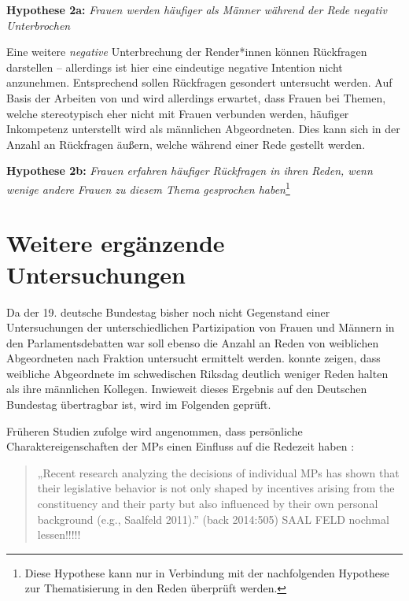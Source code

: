 \documentclass[12pt, 
    twoside=false, 
    bibliography=totoc, 
    numbers=endperiod, 
    headings=normal, 
    toc=chapterentrydotfill
    ]{scrbook}
\begin{document}
\textbf{Hypothese 2a:} \emph{Frauen werden häufiger als Männer während der Rede negativ Unterbrochen}

Eine weitere \emph{negative} Unterbrechung der Render*innen können Rückfragen darstellen -- allerdings ist hier eine eindeutige negative Intention nicht anzunehmen. Entsprechend sollen Rückfragen gesondert untersucht werden. Auf Basis der Arbeiten von \textcite{brescoll_2011} und \textcite{eagly_2002}  wird allerdings erwartet, dass Frauen bei Themen, welche stereotypisch eher nicht mit Frauen verbunden werden, häufiger Inkompetenz unterstellt wird als männlichen Abgeordneten. Dies kann sich in der Anzahl an Rückfragen äußern, welche während einer Rede gestellt werden. 

\textbf{Hypothese 2b:} \emph{Frauen erfahren häufiger Rückfragen in ihren Reden, wenn wenige andere Frauen zu diesem Thema gesprochen haben}\footnote{Diese Hypothese kann nur in Verbindung mit der nachfolgenden Hypothese zur Thematisierung in den Reden überprüft werden.}



\section{Weitere ergänzende Untersuchungen}

Da der 19. deutsche Bundestag bisher noch nicht Gegenstand einer Untersuchungen der unterschiedlichen Partizipation von Frauen und Männern in den Parlamentsdebatten war soll ebenso die Anzahl an Reden von weiblichen Abgeordneten nach Fraktion untersucht ermittelt werden. \textcite{back_2014} konnte zeigen, dass weibliche Abgeordnete im schwedischen Riksdag deutlich weniger Reden halten als ihre männlichen Kollegen. Inwieweit dieses Ergebnis auf den Deutschen Bundestag übertragbar ist, wird im Folgenden geprüft.

Früheren Studien zufolge wird angenommen, dass persönliche Charaktereigenschaften der MPs  einen Einfluss auf die Redezeit haben \parencite[505]{back_2014}:

\endquote
\begin{quote}
    „Recent research analyzing the decisions of individual MPs has shown that their legislative behavior is not only shaped by incentives arising from the constituency and their party but also influenced by their own personal background (e.g., Saalfeld 2011).”  (back 2014:505)  SAAL FELD nochmal lessen!!!!!
\end{quote} \parencite[505]{back_2014}
 
\end{document}
